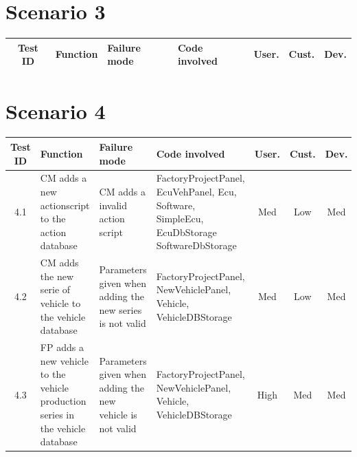\begin{landscape}
\begin{longtable}{ c | p{5cm} | p{5cm} | p{5cm} | c | c | c}
		\end{longtable}

	\section{Scenario 3}

		\begin{table}[H]
			\begin{tabular}{ c | p{5cm} | p{5cm} | p{5cm} | c | c | c}
				\hline
				{\bf Test ID} & {\bf Function} & {\bf Failure mode} & {\bf Code involved} & 
				{\bf User.} & {\bf Cust.} & {\bf Dev.} \\ \hline

			\end{tabular}
		\end{table}


	\section{Scenario 4}

		\begin{table}[H]
			\begin{tabular}{ c | p{5cm} | p{5cm} | p{5cm} | c | c | c}
				\hline
				{\bf Test ID} & {\bf Function} & {\bf Failure mode} & {\bf Code involved} & 
				{\bf User.} & {\bf Cust.} & {\bf Dev.} \\ \hline
				4.1
				& CM adds a new actionscript to the action database
				& CM adds a invalid action script
				& FactoryProjectPanel, EcuVehPanel, Ecu, Software, SimpleEcu, EcuDbStorage
				SoftwareDbStorage
				& Med & Low & Med \\ \hline
				4.2
				& CM adds the new serie of vehicle to the vehicle database
				& Parameters given when adding the new series is not valid
				& FactoryProjectPanel, NewVehiclePanel, Vehicle, VehicleDBStorage
				& Med & Low & Med \\ \hline
				4.3
				& FP adds a new vehicle to the vehicle production series in the vehicle database
				& Parameters given when adding the new vehicle is not valid
				& FactoryProjectPanel, NewVehiclePanel, Vehicle, VehicleDBStorage
				& High & Med & Med \\ \hline

			\end{tabular}
		\end{table}


\end{landscape}